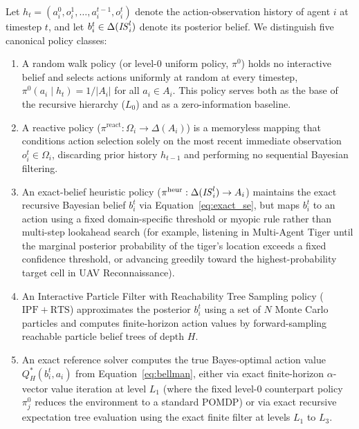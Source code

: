 \begin{definition}
  \sloppy Let $h_t = (a_i^0, o_i^1, \dots, a_i^{t-1}, o_i^t)$ denote the action-observation history of agent $i$ at timestep $t$, and let $b_i^t \in \Delta(\mathit{IS}_i^l)$ denote its posterior belief. We distinguish five canonical policy classes:
  \begin{enumerate}
    \item A random walk policy (or level-$0$ uniform policy, $\pi^0$) holds no interactive belief and selects actions uniformly at random at every timestep, $\pi^0(a_i \mid h_t) = 1/|A_i|$ for all $a_i \in A_i$. This policy serves both as the base of the recursive hierarchy ($L_0$) and as a zero-information baseline.
    \item A reactive policy ($\pi^{\mathrm{react}}: \Omega_i \to \Delta(A_i)$) is a memoryless mapping that conditions action selection solely on the most recent immediate observation $o_i^t \in \Omega_i$, discarding prior history $h_{t-1}$ and performing no sequential Bayesian filtering.
    \item An exact-belief heuristic policy ($\pi^{\mathrm{heur}}: \Delta(\mathit{IS}_i^l) \to A_i$) maintains the exact recursive Bayesian belief $b_i^t$ via Equation~\eqref{eq:exact_se}, but maps $b_i^t$ to an action using a fixed domain-specific threshold or myopic rule rather than multi-step lookahead search (for example, listening in Multi-Agent Tiger until the marginal posterior probability of the tiger's location exceeds a fixed confidence threshold, or advancing greedily toward the highest-probability target cell in UAV Reconnaissance).
    \item An Interactive Particle Filter with Reachability Tree Sampling policy ($\mathrm{IPF+RTS}$) \citep{doshi2009monte} approximates the posterior $b_i^t$ using a set of $N$ Monte Carlo particles and computes finite-horizon action values by forward-sampling reachable particle belief trees of depth $H$.
    \item An exact reference solver computes the true Bayes-optimal action value $Q_H^*(b_i^t, a_i)$ from Equation~\eqref{eq:bellman}, either via exact finite-horizon $\alpha$-vector value iteration at level $L_1$ (where the fixed level-$0$ counterpart policy $\pi_j^0$ reduces the environment to a standard POMDP) or via exact recursive expectation tree evaluation using the exact finite filter at levels $L_1$ to $L_3$.
  \end{enumerate}
  \label{def:baselines}
\end{definition}

